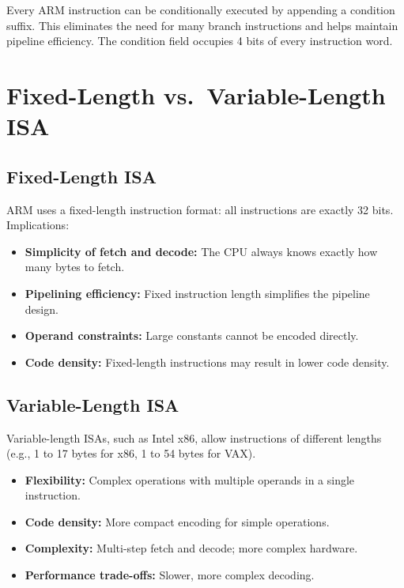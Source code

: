 \documentclass[11pt, a4paper, notitlepage]{report}
\theoremstyle{definition}
\theoremstyle{remark}
\theoremstyle{definition}
\begin{document}
\begin{keyresult}[title={Conditional Execution}]
Every ARM instruction can be conditionally executed by appending a condition suffix. This eliminates the need for many branch instructions and helps maintain pipeline efficiency. The condition field occupies 4 bits of every instruction word.
\end{keyresult}

\section{Fixed-Length vs.\ Variable-Length ISA}

\subsection{Fixed-Length ISA}

ARM uses a fixed-length instruction format: all instructions are exactly 32 bits. Implications:

\begin{itemize}
  \item \textbf{Simplicity of fetch and decode:} The CPU always knows exactly how many bytes to fetch.
  \item \textbf{Pipelining efficiency:} Fixed instruction length simplifies the pipeline design.
  \item \textbf{Operand constraints:} Large constants cannot be encoded directly.
  \item \textbf{Code density:} Fixed-length instructions may result in lower code density.
\end{itemize}

\subsection{Variable-Length ISA}

Variable-length ISAs, such as Intel x86, allow instructions of different lengths (e.g., 1 to 17 bytes for x86, 1 to 54 bytes for VAX).

\begin{itemize}
  \item \textbf{Flexibility:} Complex operations with multiple operands in a single instruction.
  \item \textbf{Code density:} More compact encoding for simple operations.
  \item \textbf{Complexity:} Multi-step fetch and decode; more complex hardware.
  \item \textbf{Performance trade-offs:} Slower, more complex decoding.
\end{itemize}
\end{document}
